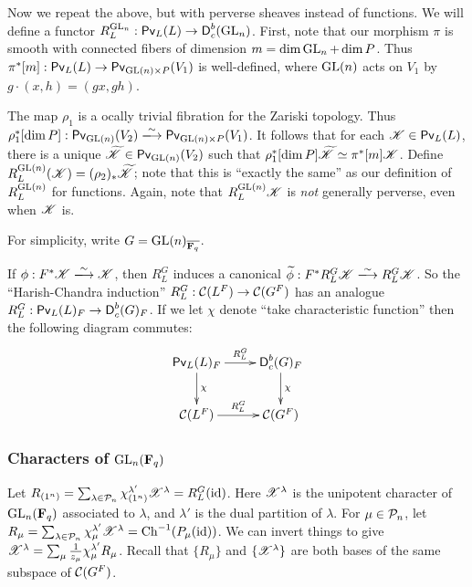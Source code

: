 Now we repeat the above, but with perverse sheaves instead of functions. 
We will define a functor 
$R_L^{\operatorname{GL}_n}:\operatorname{\mathsf{Pv}}_L(L) \to \operatorname{\mathsf{D}}_c^b(\operatorname{GL}_n)$. 
First, note that our morphism $\pi$ is smooth with connected fibers of dimension 
$m=\dim \operatorname{GL}_n + \dim P$. Thus 
$\pi^\ast[m]:\operatorname{\mathsf{Pv}}_L(L) \to \operatorname{\mathsf{Pv}}_{\operatorname{GL}(n)\times P}(V_1)$ is 
well-defined, where $\operatorname{GL}(n)$ acts on $V_1$ by 
$g\cdot (x,h) = (g x, g h)$. 

The map $\rho_1$ is a ocally trivial fibration for the Zariski topology. Thus 
$\rho_1^\ast[\dim P]:\perverse_{\generallinear(n)}(V_2) \isomorphism \perverse_{\generallinear(n)\times P}(V_1)$. It follows that for each 
$\mathscr{K}\in \operatorname{\mathsf{Pv}}_L(L)$, there is a unique 
$\widetilde{\mathscr{K}}\in \operatorname{\mathsf{Pv}}_{\operatorname{GL}(n)}(V_2)$ such that 
$\rho_1^\ast[\dim P]\widetilde{\mathscr{K}} \simeq \pi^\ast[m]\mathscr{K}$. Define 
$R_L^{\operatorname{GL}(n)}(\mathscr{K}) = (\rho_2)_\ast \widetilde{\mathscr{K}}$; note that this is 
``exactly the same'' as our definition of $R_L^{\operatorname{GL}(n)}$ for 
functions. Again, note that $R_L^{\operatorname{GL}(n)}\mathscr{K}$ is \emph{not} 
generally perverse, even when $\mathscr{K}$ is. 

For simplicity, write $G=\operatorname{GL}(n)_{\overline{\mathbf{F}_q}}$. 

If $\phi:F^\ast \sK\isomorphism \sK$, then $R_L^G$ induces a 
canonical $\widetilde\phi:F^\ast R_L^G\sK \isomorphism R_L^G \sK$. 
So the ``Harish-Chandra induction'' $R_L^G:\mathcal{C}(L^F) \to \mathcal{C}(G^F)$ has 
an analogue $R_L^G:\operatorname{\mathsf{Pv}}_L(L)_F \to \operatorname{\mathsf{D}}_c^b(G)_F$. If we 
let $\chi$ denote ``take characteristic function'' then the following 
diagram commutes:
\[\xymatrix{
  \perverse_L(L)_F \ar[r]^-{R_L^G} \ar[d]^-\chi 
    & \derived_c^b(G)_F \ar[d]^-\chi \\
  \cC(L^F) \ar[r]^-{R_L^G} 
    & \cC(G^F) 
}\]


\subsubsection{Characters of \texorpdfstring{$\operatorname{GL}_n(\mathbf{F}_q)$}{GLnFq}}

Let $R_{(1^n)}=\sum_{\lambda\in \mathcal{P}_n} \chi_{(1^n)}^{\lambda'} \mathscr{X}^\lambda = R_L^G(\textnormal{id})$. Here $\mathscr{X}^\lambda$ is the unipotent character of 
$\operatorname{GL}_n(\mathbf{F}_q)$ associated to $\lambda$, and $\lambda'$ is the 
dual partition of $\lambda$. For $\mu\in \mathcal{P}_n$, let 
$R_\mu = \sum_{\lambda\in \mathcal{P}_n} \chi_\mu^{\lambda'} \mathscr{X}^\lambda = \operatorname{Ch}^{-1}(P_\mu(\mathrm{id}))$. We can invert things to give 
$\mathscr{X}^\lambda = \sum_\mu \frac{1}{z_\mu} \chi_\mu^{\lambda'} R_\mu$. Recall that 
$\{R_\mu\}$ and $\{\mathscr{X}^\lambda\}$ are both bases of the same subspace of 
$\mathcal{C}(G^F)$. 



